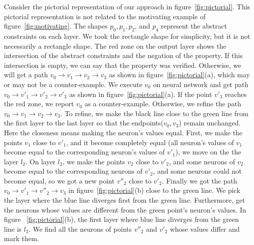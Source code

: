 Consider the pictorial representation of our approach in figure~\ref{fig:pictorial}. This pictorial representation is not 
related to the motivating example of figure~\ref{fig:motivating}. The shapes $p_0, p_1, p_2$, and $p_4$ represent 
the abstract constraints on each layer. We took the rectangle shape for simplicity,  but it is not necessarily a rectangle shape. 
The red zone on the output layer shows the intersection of the abstract constraints and the negation of the property. If this 
intersection is empty, we can say that the property was verified. Otherwise, we will get a path 
$v_0\rightarrow v_1\rightarrow v_2\rightarrow v_3$ as shown in figure~\ref{fig:pictorial}(a), which may or may not be a counter-example. 
We execute $v_0$ on neural network
and get path $v_0\rightarrow v'_1\rightarrow v'_2\rightarrow v'_3$ as shown in figure~\ref{fig:pictorial}(a). 
If the point $v'_3$ reaches the red zone, 
we report $v_0$ as a counter-example. Otherwise, we refine the path $v_0\rightarrow v_1\rightarrow v_2\rightarrow v_3$. 
To refine, we make the black line close to the green line from the first layer to the last layer so that the endpoints($v_0, v_3$)
remain unchanged. Here the closeness means making the neuron's values equal. 
First, we make the points $v_1$ close to $v'_1$, and it become completely equal (all neuron's values of $v_1$ become equal to the 
corresponding neuron's values of $v'_1$), we move on the the layer $l_2$. 
On layer $l_2$,
we make the points $v_2$ close to $v'_2$, and some neurons of $v_2$ become equal to the corresponding neurons of $v'_2$, and some
neurons could not become equal, so we got a new point $v''_2$ close to $v'_2$.  
Finally we got the path $v_0\rightarrow v'_1\rightarrow v''_2\rightarrow v_3$ in figure~\ref{fig:pictorial}(b) 
close to the green line.
We pick the layer where the blue line diverges first from the green line. Furthermore, get the neurons whose values are different 
from the green point's neuron's values. In figure ~\ref{fig:pictorial}(b), the first layer where blue line diverges from the 
green line is $l_2$.
We find all the neurons of points $v''_2$ and $v'_2$ whose values differ and mark them.     




